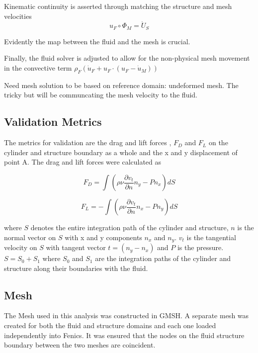 \documentclass{article}
\begin{document}
Kinematic continuity is asserted through matching the structure and mesh velocities 
\begin{equation}
u_F \circ \Phi_M = \dot{U}_S
\end{equation}

Evidently the map between the fluid and the mesh is crucial. 

Finally, the fluid solver is adjusted to allow for the non-physical mesh movement in the convective term $\rho_F (\dot{u}_F+ u_F \cdot( u_F-\dot{u}_M))$

Need mesh solution to be based on reference domain: undeformed mesh. The tricky but will be communcating the mesh velocity to the fluid. 

\subsection{Validation Metrics}
The metrics for validation are the drag and lift forces , $F_D$ and $F_L$ on the cylinder and structure boundary as a whole and  the x and y displacement of point A. The drag and lift forces were calculated as 

\begin{equation}
F_D = \int ( \rho \nu \frac{\partial v_t}{\partial n}  n_y - P n_x ) dS
\end{equation}

\begin{equation}
F_L = - \int ( \rho \nu \frac{\partial v_t}{\partial n}  n_x - P n_y ) dS
\end{equation}

where $S$ denotes the entire integration path of the cylinder and structure, $n$ is the normal vector on $S$ with x and y components $n_x$ and $n_y$. $v_t$ is the tangential velocity on $S$ with tangent vector $t = (n_y - n_x)$ and $P$ is the pressure. $S = S_0 +S_1$ where $S_0$ and $S_1$ are the integration paths of the cylinder and structure along their boundaries with the fluid. 

\subsection{Mesh}

The Mesh used in this analysis was constructed in GMSH. A separate mesh was created for both the fluid and structure domains and each one loaded independently into Fenics. It was ensured that the nodes on the fluid structure boundary between the two meshes are coincident. 
\end{document}
